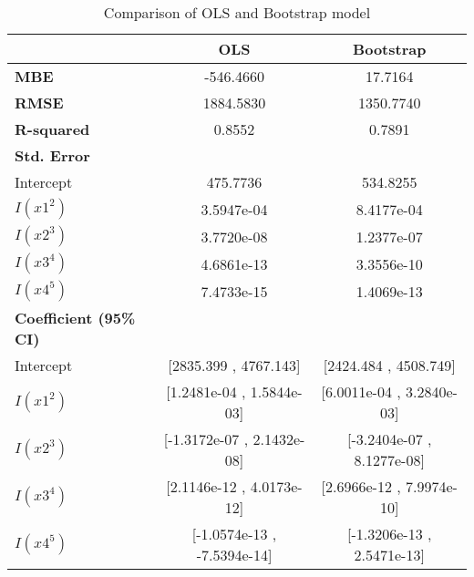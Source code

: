 \begin{table}[h!]
	\centering
	\caption{Comparison of OLS and Bootstrap model}
	\begin{tabular}{lcc}
		\hline
		& \textbf{OLS} & \textbf{Bootstrap} \\
		\hline
		\textbf{MBE} & -546.4660 & 17.7164 \\
		\textbf{RMSE} & 1884.5830 & 1350.7740 \\
		\textbf{R-squared} & 0.8552 & 0.7891 \\
		\hline
		\textbf{Std. Error} \\
		\hline
		Intercept & 475.7736 & 534.8255 \\
		$I(x1^2)$ & 3.5947e-04 & 8.4177e-04 \\
		$I(x2^3)$ & 3.7720e-08 & 1.2377e-07 \\
		$I(x3^4)$ & 4.6861e-13 & 3.3556e-10 \\
		$I(x4^5)$ & 7.4733e-15 & 1.4069e-13 \\
		\hline
		\textbf{Coefficient (95\% CI)} \\
		\hline
		Intercept & [2835.399 , 4767.143] & [2424.484 , 4508.749] \\
		$I(x1^2)$ & [1.2481e-04 , 1.5844e-03] & [6.0011e-04 , 3.2840e-03] \\
		$I(x2^3)$ & [-1.3172e-07 , 2.1432e-08] & [-3.2404e-07 , 8.1277e-08] \\
		$I(x3^4)$ & [2.1146e-12 , 4.0173e-12] & [2.6966e-12 , 7.9974e-10] \\
		$I(x4^5)$ & [-1.0574e-13 , -7.5394e-14] & [-1.3206e-13 , 2.5471e-13] \\
		\hline
	\end{tabular}
\end{table}


